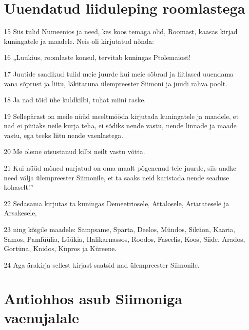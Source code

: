 \section*{Uuendatud liiduleping roomlastega}

\par 15 Siis tulid Numeenios ja need, kes koos temaga olid, Roomast, kaasas kirjad kuningatele ja maadele. Neis oli kirjutatud nõnda:
\par 16 „Luukius, roomlaste konsul, tervitab kuningas Ptolemaiost!
\par 17 Juutide saadikud tulid meie juurde kui meie sõbrad ja liitlased uuendama vana sõprust ja liitu, läkitatuna ülempreester Siimoni ja juudi rahva poolt.
\par 18 Ja nad tõid ühe kuldkilbi, tuhat miini raske.
\par 19 Sellepärast on meile nüüd meeltmööda kirjutada kuningatele ja maadele, et nad ei püüaks neile kurja teha, ei sõdiks nende vastu, nende linnade ja maade vastu, ega teeks liitu nende vaenlastega.
\par 20 Me oleme otsustanud kilbi neilt vastu võtta.
\par 21 Kui nüüd mõned nurjatud on oma maalt põgenenud teie juurde, siis andke need välja ülempreester Siimonile, et ta saaks neid karistada nende seaduse kohaselt!”
\par 22 Sedasama kirjutas ta kuningas Demeetriosele, Attalosele, Ariaratesele ja Arsakesele,
\par 23 ning kõigile maadele: Sampsame, Sparta, Deelos, Mündos, Siküon, Kaaria, Samos, Pamfüülia, Lüükia, Halikarnassos, Roodos, Faseelis, Koos, Siide, Arados, Gortüna, Knidos, Küpros ja Küreene.
\par 24 Aga ärakirja sellest kirjast saatsid nad ülempreester Siimonile. 

\section*{Antiohhos asub Siimoniga vaenujalale}

